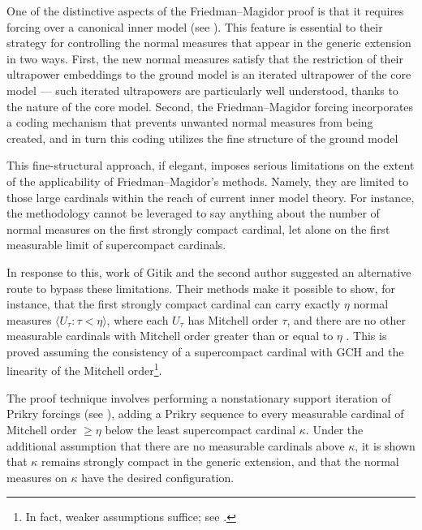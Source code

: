 \documentclass[11pt]{amsart}
\theoremstyle{definition}
\theoremstyle{remark}
\newcommand\<{{<}}
\begin{document}
\smallskip

One of the distinctive aspects of the Friedman--Magidor proof is that it requires forcing over a canonical inner model (see \cite{MitHand}). This feature is essential to their strategy for controlling the normal measures that appear in the generic extension in two ways. First, the new normal measures satisfy that the restriction of their ultrapower embeddings to the ground model is an iterated ultrapower  of the core model  \cite{KunenMeasures, Mitchellcore, Schi} ––  such iterated ultrapowers are particularly well understood, thanks to the nature of the core model. Second, the Friedman--Magidor forcing incorporates a coding mechanism that prevents unwanted normal measures from being created, and in turn this coding utilizes the fine structure of the ground model

\smallskip

This fine-structural  approach, if elegant, imposes serious limitations on the extent of the applicability of Friedman--Magidor's methods. Namely, they are  limited to those large cardinals within the reach of current inner model theory.
For instance, the methodology cannot be leveraged to say anything about the number of normal measures on the first strongly compact cardinal, let alone on the first measurable limit of supercompact cardinals.

\smallskip

In response to this, work of Gitik and the second author \cite{GitikKaplan} suggested an alternative route to bypass these limitations. Their methods make it possible to show, for instance, that the first strongly compact cardinal can carry exactly $\eta$ normal measures $\langle U_\tau : \tau < \eta \rangle$, where each $U_\tau$ has Mitchell order $\tau$, and there are no other measurable cardinals with Mitchell order greater than or equal to $\eta$  \cite[Theorem 4.16]{GitikKaplan}. This is proved assuming the consistency of a supercompact cardinal with GCH and the linearity of the Mitchell order\footnote{In fact, weaker assumptions suffice; see \cite[Theorem 4.16]{GitikKaplan}.}. 

The proof technique involves performing a nonstationary support iteration of Prikry forcings (see \cite{BenNeriaUnger}), adding a Prikry sequence to every measurable cardinal of Mitchell order $\geq \eta$ below the least supercompact cardinal $\kappa$. Under the additional assumption that there are no measurable cardinals above $\kappa$, it is shown that $\kappa$ remains strongly compact in the generic extension, and that the normal measures on $\kappa$ have the desired configuration.
\end{document}
